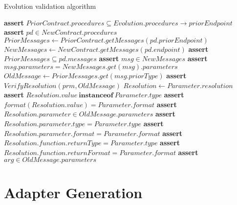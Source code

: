 \begin{algorithm}
    \caption{Evolution validation algorithm}\label{alg:evoalg}
    \begin{algorithmic}[1]
            \State \textbf{assert} $PriorContract.procedures \subseteq Evolution.procedures\rightarrow priorEndpoint$
                \State \textbf{assert} $pd \in NewContract.procedures$
                \State $PriorMessages \leftarrow PriorContract.getMessages(pd.priorEndpoint)$
                \State $NewMessages \leftarrow NewContract.getMessages(pd.endpoint)$
                \State \textbf{assert} $PriorMessages \subseteq pd.messages$
                    \State \textbf{assert} $msg \in NewMessages$
                    \State \textbf{assert} $msg.parameters = NewMessages.get(msg).parameters$
                        \State $OldMessage \leftarrow PriorMessages.get(msg.priorType)$
                        \State \textbf{assert} $VerifyResolution(prm, OldMessage)$
                    \EndFor
                \EndFor
            \EndFor
        \EndProcedure
        \Statex
            \State $Resolution \leftarrow Parameter.resolution$
                \State \textbf{assert} $Resolution.value\ \textbf{instanceof}\ Parameter.type$
                \State \textbf{assert} $format(Resolution.value) = Parameter.format$
                \State \textbf{assert} $Resolution.parameter \in OldMessage.parameters$
                \State \textbf{assert} $Resolution.parameter.type = Parameter.type$
                \State \textbf{assert} $Resolution.parameter.format = Parameter.format$
                \State \textbf{assert} $Resolution.function.returnType = Parameter.type$
                \State \textbf{assert} $Resolution.function.returnFormat = Parameter.format$
                    \State \textbf{assert} $arg \in OldMessage.parameters$
                \EndFor
            \EndIf
        \EndProcedure
    \end{algorithmic}
\end{algorithm}

\section{Adapter Generation} %
\label{sec:adapter_generation}

